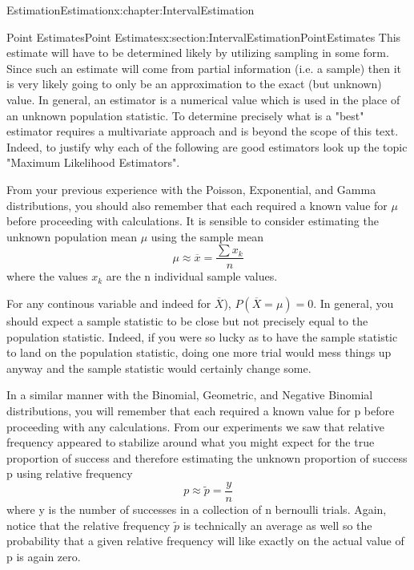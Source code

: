 \documentclass[oneside,10pt,]{book}
\numberwithin{equation}{section}
\begin{document}
\begin{chapterptx}{Estimation}{}{Estimation}{}{}{x:chapter:IntervalEstimation}
\begin{sectionptx}{Point Estimates}{}{Point Estimates}{}{}{x:section:IntervalEstimationPointEstimates}
This estimate will have to be determined likely by utilizing sampling in some form. Since such an estimate will come from partial information (i.e. a sample) then it is very likely going to only be an approximation to the exact (but unknown) value. In general, an estimator is a numerical value which is used in the place of an unknown population statistic. To determine precisely what is a "best" estimator requires a multivariate approach and is beyond the scope of this text. Indeed, to justify why each of the following are good estimators look up the topic "Maximum Likelihood Estimators".%
\par
From your previous experience with the Poisson, Exponential, and Gamma distributions, you should also remember that each required a known value for \(\mu\) before proceeding with calculations.  It is sensible to consider estimating the unknown population mean \(\mu\) using the sample mean%
\begin{equation*}
\mu \approx \overline{x} = \frac{\sum x_k}{n}
\end{equation*}
where the values \(x_k\) are the n individual sample values.%
\par
For any continous variable and indeed for \(\overline{X}\)), \(P(\overline{X} = \mu) = 0\). In general, you should expect a sample statistic to be close but not precisely equal to the population statistic. Indeed, if you were so lucky as to have the sample statistic to land on the population statistic, doing one more trial would mess things up anyway and the sample statistic would certainly change some.%
\par
In a similar manner with the Binomial, Geometric, and Negative Binomial distributions, you will remember that each required a known value for p before  proceeding with any calculations. From our experiments we saw that relative frequency appeared to stabilize around what you might expect for the true proportion of success and therefore estimating the unknown proportion of success p using relative frequency%
\begin{equation*}
p \approx \tilde{p} = \frac{y}{n}
\end{equation*}
where y is the number of successes in a collection of n bernoulli trials. Again, notice that the relative frequency \(\tilde{p}\) is technically an average as well so the probability that a given relative frequency will like exactly on the actual value of p is again zero.%
\par

\end{sectionptx}
\end{chapterptx}
\end{document}
